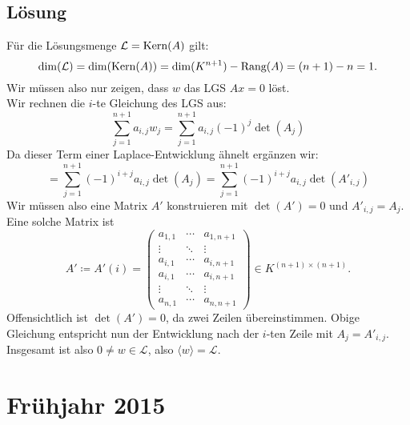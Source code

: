 \subsection{Lösung}
Für die Lösungsmenge \( \mathcal{L} = \text{Kern}(A) \) gilt:
\begin{equation*}
	\dim(\mathcal{L}) = \dim(\text{Kern}(A)) = \dim(K^{n+1}) - \text{Rang}(A) = (n+1) - n = 1\text{.}
\end{equation*}
Wir müssen also nur zeigen, dass \( w \) das LGS \( Ax = 0 \) löst. \\
Wir rechnen die \( i \)-te Gleichung des LGS aus:
\begin{equation*}
	\sum_{j=1}^{n+1}a_{i,j}w_j = \sum_{j=1}^{n+1} a_{i,j}(-1)^j\det(A_j)
\end{equation*}
Da dieser Term einer Laplace-Entwicklung ähnelt ergänzen wir:
\begin{equation*}
	= \sum_{j=1}^{n+1}(-1)^{i+j}a_{i,j}\det(A_j) = \sum_{j=1}^{n+1}(-1)^{i+j}a_{i,j}\det(A'_{i,j})
\end{equation*}
Wir müssen also eine Matrix \( A' \) konstruieren mit \( \det(A') = 0 \) und \( A'_{i,j} = A_j \). Eine solche Matrix ist
\begin{equation*}
	A' \coloneqq A'(i) = \begin{pmatrix}
		a_{1,1} & \cdots & a_{1, n+1} \\
		\vdots & \ddots & \vdots \\
		a_{i,1} & \cdots & a_{i,n+1} \\
		a_{i,1} & \cdots & a_{i,n+1} \\
		\vdots & \ddots & \vdots \\
		a_{n,1} & \cdots & a_{n,n+1}
	\end{pmatrix} \in K^{(n+1) \times (n+1)}\text{.}
\end{equation*}
Offensichtlich ist \( \det(A') = 0 \), da zwei Zeilen übereinstimmen. Obige Gleichung entspricht nun der Entwicklung nach der \( i \)-ten Zeile mit \( A_j = A'_{i,j} \). \\
Insgesamt ist also \( 0 \neq w \in \mathcal{L} \), also \( \langle w \rangle = \mathcal{L} \).

\newpage

\section{Frühjahr 2015}

